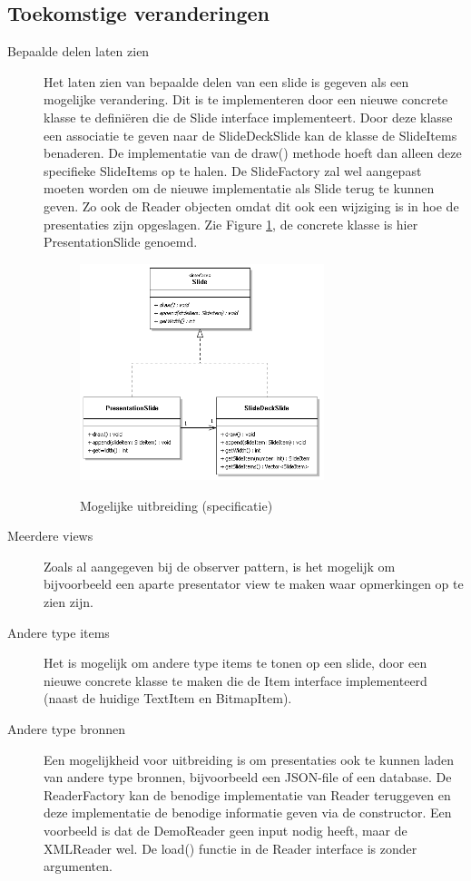 \documentclass[a4paper]{article}
\begin{document}
\subsection{Toekomstige veranderingen}
\begin{description}
\item[Bepaalde delen laten zien] Het laten zien van bepaalde delen van een slide is gegeven als een mogelijke verandering. Dit is te implementeren door een nieuwe concrete klasse te definiëren die de Slide interface implementeert. Door deze klasse een associatie te geven naar de SlideDeckSlide kan de klasse de SlideItems benaderen. De implementatie van de draw() methode hoeft dan alleen deze specifieke SlideItems op te halen. De SlideFactory zal wel aangepast moeten worden om de nieuwe implementatie als Slide terug te kunnen geven. Zo ook de Reader objecten omdat dit ook een wijziging is in hoe de presentaties zijn opgeslagen. Zie Figure \ref{fig:mogelijkeuitbreiding}, de concrete klasse is hier PresentationSlide genoemd.
\begin{figure}[htbp]
\caption{Mogelijke uitbreiding (specificatie)}
\centering
\includegraphics[width=0.70\textwidth]{MogelijkeUitbreiding.PNG}
\label{fig:mogelijkeuitbreiding}
\end{figure}

\item[Meerdere views] Zoals al aangegeven bij de observer pattern, is het mogelijk om bijvoorbeeld een aparte presentator view te maken waar opmerkingen op te zien zijn.
\item[Andere type items] Het is mogelijk om andere type items te tonen op een slide, door een nieuwe concrete klasse te maken die de Item interface implementeerd (naast de huidige TextItem en BitmapItem).
\item[Andere type bronnen] Een mogelijkheid voor uitbreiding is om presentaties ook te kunnen laden van andere type bronnen, bijvoorbeeld een JSON-file of een database. De ReaderFactory kan de benodige implementatie van Reader teruggeven en deze implementatie de benodige informatie geven via de constructor. Een voorbeeld is dat de DemoReader geen input nodig heeft, maar de XMLReader wel.  De load() functie in de Reader interface is zonder argumenten.
\end{description}
\end{document}
